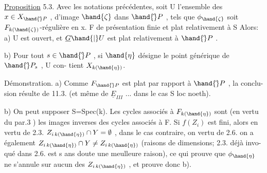 
\uline{Proposition} 5.3.   Avec les notations précédentes, soit U l'ensemble des
$x\in X_{\hand{\check{}}P}$ , d'image $\hand{\zeta}$ dans $\hand{\check{}}P$ , tels que $\phi_{\hand{\zeta}}$ soit $F_{k(\hand{\zeta})}$-régulière en x.   F de présentation finie et plat relativement à S\hand{,} Alors:
a) U est ouvert, et $\underline{G}\hand{|}U$ est plat relativement à $\hand{\check{}}P$ .

b) Pour tout $s\in\hand{\check{}}P$ , si $\hand{\eta}$ désigne le point générique de $\hand{\check{}}P_s$ , U con-%
tient $X_{k(\hand{\eta})}$.

Démonstration. a) Comme $F_{\hand{\check{}}P}$ est  plat par rapport à $\hand{\check{}}P$ , la conclu-%
sion résulte de 11.3. (et même de $\underline{E}_{III}$ ... dans le cas S loc noeth).

b) On peut supposer S=Spec(k). Les cycles associés à $F_{k(\hand{\eta})}$ sont
(en vertu du par.3 ) les images inverses des cycles  associés à F.  Si $f(Z_i)$ est fini, alors en vertu de 2.3. 
$Z_{i\,k(\hand{\eta})}\cap Y = \emptyset$ , dans le cas contraire, on vertu de 2.6. on a
également $Z_{i\,k(\hand{\eta})}\cap Y \neq Z_{i\,k(\hand{\eta})}$ (raisons de dimensions; 2.3. déjà invo-%
qué dans 2.6. est s ans doute une meulleure raison), ce qui prouve que $\phi_{\hand{\eta}}$
ne s'annule sur aucun des $Z_{i\,k(\hand{\eta})}$ , et prouve donc b).

